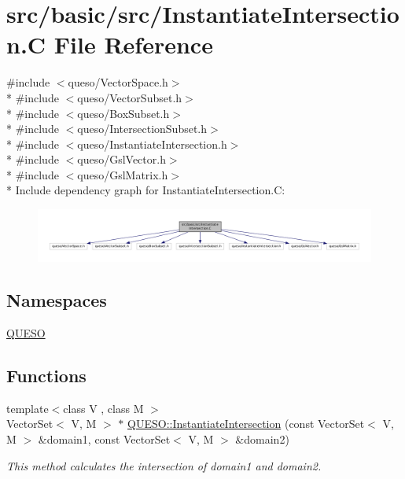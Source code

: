 \hypertarget{_instantiate_intersection_8_c}{\section{src/basic/src/\-Instantiate\-Intersection.C File Reference}
\label{_instantiate_intersection_8_c}
}
{\ttfamily \#include $<$queso/\-Vector\-Space.\-h$>$}\\*
{\ttfamily \#include $<$queso/\-Vector\-Subset.\-h$>$}\\*
{\ttfamily \#include $<$queso/\-Box\-Subset.\-h$>$}\\*
{\ttfamily \#include $<$queso/\-Intersection\-Subset.\-h$>$}\\*
{\ttfamily \#include $<$queso/\-Instantiate\-Intersection.\-h$>$}\\*
{\ttfamily \#include $<$queso/\-Gsl\-Vector.\-h$>$}\\*
{\ttfamily \#include $<$queso/\-Gsl\-Matrix.\-h$>$}\\*
Include dependency graph for Instantiate\-Intersection.\-C\-:
\nopagebreak
\begin{figure}[H]
\begin{center}
\leavevmode
\includegraphics[width=350pt]{_instantiate_intersection_8_c__incl}
\end{center}
\end{figure}
\subsection*{Namespaces}
\begin{DoxyCompactItemize}
\item 
\hyperlink{namespace_q_u_e_s_o}{Q\-U\-E\-S\-O}
\end{DoxyCompactItemize}
\subsection*{Functions}
\begin{DoxyCompactItemize}
\item 
{\footnotesize template$<$class V , class M $>$ }\\Vector\-Set$<$ V, M $>$ $\ast$ \hyperlink{namespace_q_u_e_s_o_aa79046437ab085c5487ae16e9a0baeec}{Q\-U\-E\-S\-O\-::\-Instantiate\-Intersection} (const Vector\-Set$<$ V, M $>$ \&domain1, const Vector\-Set$<$ V, M $>$ \&domain2)
\begin{DoxyCompactList}\small\item\em This method calculates the intersection of {\ttfamily domain1} and {\ttfamily domain2}. \end{DoxyCompactList}\end{DoxyCompactItemize}
